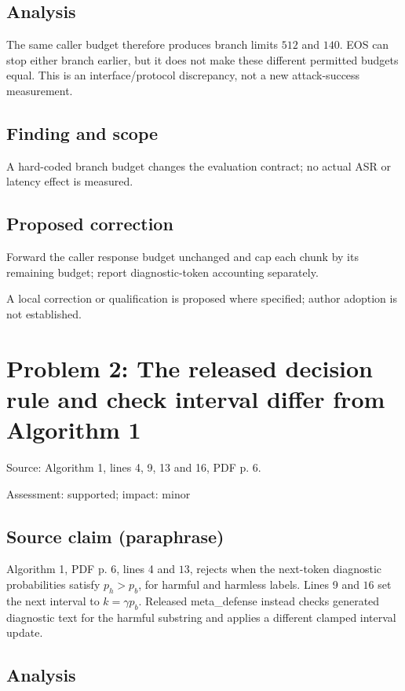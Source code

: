 \documentclass[11pt]{article}
\begin{document}
\subsection*{Analysis}

The same caller budget therefore produces branch limits \(512\) and \(140\). EOS can stop either branch earlier, but it does not make these different permitted budgets equal. This is an interface/protocol discrepancy, not a new attack-success measurement.

\subsection*{Finding and scope}

A hard-coded branch budget changes the evaluation contract; no actual ASR or latency effect is measured.

\subsection*{Proposed correction}

Forward the caller response budget unchanged and cap each chunk by its remaining budget; report diagnostic-token accounting separately.

A local correction or qualification is proposed where specified; author adoption is not established.

\section*{Problem 2: The released decision rule and check interval differ from Algorithm 1}

Source: Algorithm 1, lines 4, 9, 13 and 16, PDF p. 6.

Assessment: supported; impact: minor

\subsection*{Source claim (paraphrase)}

Algorithm 1, PDF p. 6, lines 4 and \(13\), rejects when the next-token diagnostic probabilities satisfy \(p_h>p_b\), for harmful and harmless labels. Lines 9 and \(16\) set the next interval to \(k=\gamma p_b\). Released meta\_defense instead checks generated diagnostic text for the harmful substring and applies a different clamped interval update.

\subsection*{Analysis}
\end{document}
